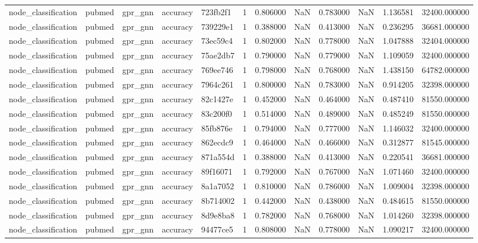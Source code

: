 \begin{tabular}{lllllrrrrrrr}
node_classification & pubmed & gpr_gnn & accuracy & 723fb2f1 & 1 & 0.806000 & NaN & 0.783000 & NaN & 1.136581 & 32400.000000 \\
node_classification & pubmed & gpr_gnn & accuracy & 739229e1 & 1 & 0.388000 & NaN & 0.413000 & NaN & 0.236295 & 36681.000000 \\
node_classification & pubmed & gpr_gnn & accuracy & 73ec59c4 & 1 & 0.802000 & NaN & 0.778000 & NaN & 1.047888 & 32404.000000 \\
node_classification & pubmed & gpr_gnn & accuracy & 75ae2db7 & 1 & 0.790000 & NaN & 0.779000 & NaN & 1.109059 & 32400.000000 \\
node_classification & pubmed & gpr_gnn & accuracy & 769ee746 & 1 & 0.798000 & NaN & 0.768000 & NaN & 1.438150 & 64782.000000 \\
node_classification & pubmed & gpr_gnn & accuracy & 7964c261 & 1 & 0.800000 & NaN & 0.783000 & NaN & 0.914205 & 32398.000000 \\
node_classification & pubmed & gpr_gnn & accuracy & 82c1427e & 1 & 0.452000 & NaN & 0.464000 & NaN & 0.487410 & 81550.000000 \\
node_classification & pubmed & gpr_gnn & accuracy & 83c200f0 & 1 & 0.514000 & NaN & 0.489000 & NaN & 0.485249 & 81550.000000 \\
node_classification & pubmed & gpr_gnn & accuracy & 85fb876e & 1 & 0.794000 & NaN & 0.777000 & NaN & 1.146032 & 32400.000000 \\
node_classification & pubmed & gpr_gnn & accuracy & 862ecdc9 & 1 & 0.464000 & NaN & 0.466000 & NaN & 0.312877 & 81545.000000 \\
node_classification & pubmed & gpr_gnn & accuracy & 871a554d & 1 & 0.388000 & NaN & 0.413000 & NaN & 0.220541 & 36681.000000 \\
node_classification & pubmed & gpr_gnn & accuracy & 89f16071 & 1 & 0.792000 & NaN & 0.767000 & NaN & 1.071460 & 32400.000000 \\
node_classification & pubmed & gpr_gnn & accuracy & 8a1a7052 & 1 & 0.810000 & NaN & 0.786000 & NaN & 1.009004 & 32398.000000 \\
node_classification & pubmed & gpr_gnn & accuracy & 8b714002 & 1 & 0.442000 & NaN & 0.438000 & NaN & 0.484615 & 81550.000000 \\
node_classification & pubmed & gpr_gnn & accuracy & 8d9e8ba8 & 1 & 0.782000 & NaN & 0.768000 & NaN & 1.014260 & 32398.000000 \\
node_classification & pubmed & gpr_gnn & accuracy & 94477ce5 & 1 & 0.808000 & NaN & 0.778000 & NaN & 1.090217 & 32400.000000 \\

\end{tabular}

